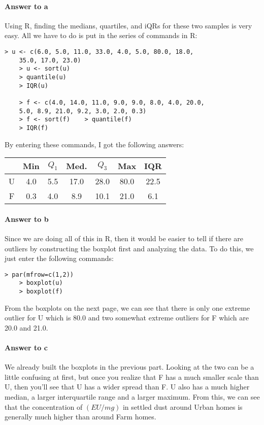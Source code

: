 \documentclass{article}
\begin{document}
	\paragraph{Answer to a} Using R, finding the medians, quartiles, and iQRs for these two samples is very easy. All we have to do is put in the series of commands in R: 
	\begin{lstlisting}[frame=single]
    > u <- c(6.0, 5.0, 11.0, 33.0, 4.0, 5.0, 80.0, 18.0,
    35.0, 17.0, 23.0)
    > u <- sort(u)
    > quantile(u)
    > IQR(u)
    
    > f <- c(4.0, 14.0, 11.0, 9.0, 9.0, 8.0, 4.0, 20.0,
    5.0, 8.9, 21.0, 9.2, 3.0, 2.0, 0.3)
    > f <- sort(f)    > quantile(f)
    > IQR(f)
	\end{lstlisting} 
	By entering these commands, I got the following answers:
	\begin{table}[!htb]
	\begin{tabular}{ | c || c | c | c | c | c | c | } \hline
		& Min & $Q_1$ & Med. & $Q_3$ & Max & IQR\\ \hline \hline
		U & 4.0 & 5.5 & 17.0 & 28.0 & 80.0 & 22.5\\ \hline
		F & 0.3 & 4.0 & 8.9 & 10.1 & 21.0 & 6.1 \\ \hline
	\end{tabular}
	\end{table}
	
	\paragraph{Answer to b} Since we are doing all of this in R, then it would be easier to tell if there are outliers by constructing the boxplot first and analyzing the data. To do this, we just enter the following commands:
	\begin{lstlisting}[frame=single]
    > par(mfrow=c(1,2))
    > boxplot(u)
    > boxplot(f)
	\end{lstlisting}
	
	From the boxplots on the next page, we can see that there is only one extreme outlier for U 
	which is 80.0 and two somewhat extreme outliers for F which are 20.0 and 21.0.
	
	\paragraph{Answer to c} We already built the boxplots in the previous part. Looking at the two can be a little confusing at first, but once you realize that F has a much smaller scale than U, then you'll see that U has a wider spread than F. U also has a much higher median, a larger interquartile range and a larger maximum. From this, we can see that the concentration of $(EU/mg)$ in settled dust around Urban homes is generally much higher than around Farm homes.
	
\end{document}
